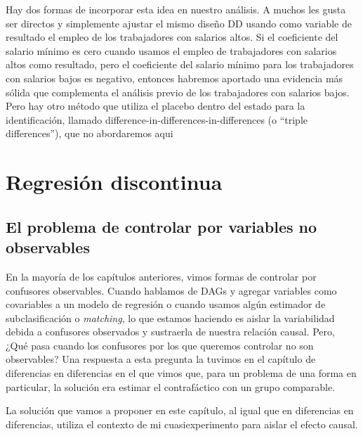 \documentclass[
  letterpaper,
  DIV=11,
  numbers=noendperiod,
  oneside]{scrreprt}
\begin{document}
Hay dos formas de incorporar esta idea en nuestro análisis. A muchos les
gusta ser directos y simplemente ajustar el mismo diseño DD usando como
variable de resultado el empleo de los trabajadores con salarios altos.
Si el coeficiente del salario mínimo es cero cuando usamos el empleo de
trabajadores con salarios altos como resultado, pero el coeficiente del
salario mínimo para los trabajadores con salarios bajos es negativo,
entonces habremos aportado una evidencia más sólida que complementa el
análisis previo de los trabajadores con salarios bajos. Pero hay otro
método que utiliza el placebo dentro del estado para la identificación,
llamado difference-in-differences-in-differences (o ``triple
differences''), que no abordaremos aqui


\hypertarget{sec-random-exp}{%
\chapter{Regresión discontinua}\label{sec-random-exp}}

\hypertarget{el-problema-de-controlar-por-variables-no-observables}{%
\section{El problema de controlar por variables no
observables}\label{el-problema-de-controlar-por-variables-no-observables}}

En la mayoría de los capítulos anteriores, vimos formas de controlar por
confusores observables. Cuando hablamos de DAGs y agregar variables como
covariables a un modelo de regresión o cuando usamos algún estimador de
subclasificación o \emph{matching}, lo que estamos haciendo es aislar la
variabilidad debida a confusores observados y sustraerla de nuestra
relación causal. Pero, ¿Qué pasa cuando los confusores por los que
queremos controlar no son observables? Una respuesta a esta pregunta la
tuvimos en el capítulo de diferencias en diferencias en el que vimos
que, para un problema de una forma en particular, la solución era estimar el
contrafáctico con un grupo comparable.

La solución que vamos a proponer en este capítulo, al igual que en
diferencias en diferencias, utiliza el contexto de mi cuasiexperimento
para aislar el efecto causal.
\end{document}
